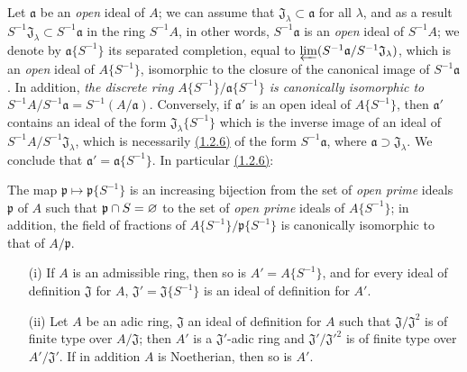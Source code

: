 \begin{env}[7.6.9]
\label{env-0.7.6.9}
Let $\mathfrak{a}$ be an {\em open} ideal of $A$; we can assume that
$\mathfrak{J}_\lambda\subset\mathfrak{a}$ for all $\lambda$, and as a result
$S^{-1}\mathfrak{J}_\lambda\subset S^{-1}\mathfrak{a}$ in the ring $S^{-1}A$, in other words,
$S^{-1}\mathfrak{a}$ is an {\em open} ideal of $S^{-1}A$; we denote by $\mathfrak{a}\{S^{-1}\}$ its
separated completion, equal to $\varprojlim(S^{-1}\mathfrak{a}/S^{-1}\mathfrak{J}_\lambda)$, which is
an {\em open} ideal of $A\{S^{-1}\}$, isomorphic to the closure of the canonical image of
$S^{-1}\mathfrak{a}$. In addition, {\em the discrete ring $A\{S^{-1}\}/\mathfrak{a}\{S^{-1}\}$ is
canonically isomorphic to $S^{-1}A/S^{-1}\mathfrak{a}=S^{-1}(A/\mathfrak{a})$}. Conversely, if
$\mathfrak{a}'$ is an open ideal of $A\{S^{-1}\}$, then $\mathfrak{a}'$ contains an ideal of the
form $\mathfrak{J}_\lambda\{S^{-1}\}$ which is the inverse image of an ideal of
$S^{-1}A/S^{-1}\mathfrak{J}_\lambda$, which is necessarily \hyperref[env-0.1.2.6]{(1.2.6)} of the
form $S^{-1}\mathfrak{a}$, where $\mathfrak{a}\supset\mathfrak{J}_\lambda$. We conclude that
$\mathfrak{a}'=\mathfrak{a}\{S^{-1}\}$. In particular \hyperref[env-0.1.2.6]{(1.2.6)}:
\end{env}

\begin{prop}[7.6.10]
\label{prop-0.7.6.10}
The map $\mathfrak{p}\mapsto\mathfrak{p}\{S^{-1}\}$ is an increasing bijection from the set of
{\em open prime} ideals $\mathfrak{p}$ of $A$ such that $\mathfrak{p}\cap S=\varnothing$ to the set
of {\em open prime} ideals
of $A\{S^{-1}\}$; in addition, the field of fractions of $A\{S^{-1}\}/\mathfrak{p}\{S^{-1}\}$ is
canonically isomorphic to that of $A/\mathfrak{p}$.
\end{prop}

\begin{prop}[7.6.11]
\label{prop-0.7.6.11}
\medskip\noindent
\begin{itemize}
  \item[{\rm(i)}] If $A$ is an admissible ring, then so is $A'=A\{S^{-1}\}$, and for every ideal
    of definition $\mathfrak{J}$ for $A$, $\mathfrak{J}'=\mathfrak{J}\{S^{-1}\}$ is an ideal of
    definition for $A'$.
  \item[{\rm(ii)}] Let $A$ be an adic ring, $\mathfrak{J}$ an ideal of definition for $A$ such that
    $\mathfrak{J}/\mathfrak{J}^2$ is of finite type over $A/\mathfrak{J}$; then $A'$ is a
    $\mathfrak{J}'$-adic ring and $\mathfrak{J}'/{\mathfrak{J}'}^2$ is of finite type over
    $A'/\mathfrak{J}'$. If in addition $A$ is Noetherian, then so is $A'$.
\end{itemize}
\end{prop}

